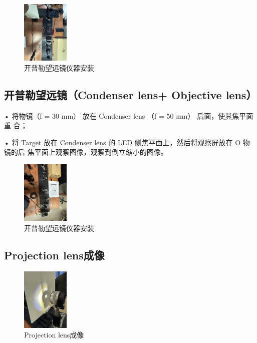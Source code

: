 \documentclass{ctexart}
\begin{document}
\begin{figure}[htbp]
  \centering
  \includegraphics[width=0.2\textwidth,height=0.3\textwidth]{pictures/微信图片_20241010200924.jpg}
  \caption{开普勒望远镜仪器安装}
\end{figure} 

\subsection{开普勒望远镜（Condenser lens+ Objective lens）}
• 将物镜（f = 30 mm） 放在 Condenser lens （f = 50 mm） 后面，使其焦平面重
合；

• 将 Target 放在 Condenser lens 的 LED 侧焦平面上，然后将观察屏放在 O 物镜的后
焦平面上观察图像，观察到倒立缩小的图像。
\begin{figure}[htbp]
  \centering
  \includegraphics[width=0.2\textwidth,height=0.3\textwidth]{pictures/微信图片_20241010200942.jpg}
  \caption{开普勒望远镜仪器安装}
\end{figure} 
\subsection{Projection lens成像}
\begin{figure}[htbp]
  \centering
  \includegraphics[width=0.2\textwidth,height=0.3\textwidth]{pictures/微信图片_20241010200955.jpg}
  \caption{Projection lens成像}
\end{figure} 
\end{document}
